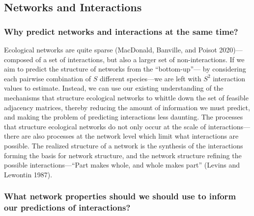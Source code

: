 \documentclass[10pt,oneside]{article}
\begin{document}
\hypertarget{networks-and-interactions}{%
\subsection{Networks and Interactions}\label{networks-and-interactions}}

\hypertarget{why-predict-networks-and-interactions-at-the-same-time}{%
\subsubsection{Why predict networks and interactions at the same
time?}\label{why-predict-networks-and-interactions-at-the-same-time}}

Ecological networks are quite sparse (MacDonald, Banville, and Poisot
2020)---composed of a set of interactions, but also a larger set of
non-interactions. If we aim to predict the structure of networks from
the ``bottom-up''--- by considering each pairwise combination of \(S\)
different species---we are left with \(S^2\) interaction values to
estimate. Instead, we can use our existing understanding of the
mechanisms that structure ecological networks to whittle down the set of
feasible adjacency matrices, thereby reducing the amount of information
we must predict, and making the problem of predicting interactions less
daunting. The processes that structure ecological networks do not only
occur at the scale of interactions---there are also processes at the
network level which limit what interactions are possible. The realized
structure of a network is the synthesis of the interactions forming the
basis for network structure, and the network structure refining the
possible interactions---``Part makes whole, and whole makes part''
(Levins and Lewontin 1987).

\hypertarget{what-network-properties-should-we-should-use-to-inform-our-predictions-of-interactions}{%
\subsubsection{What network properties should we should use to inform
our predictions of
interactions?}\label{what-network-properties-should-we-should-use-to-inform-our-predictions-of-interactions}}
\end{document}

